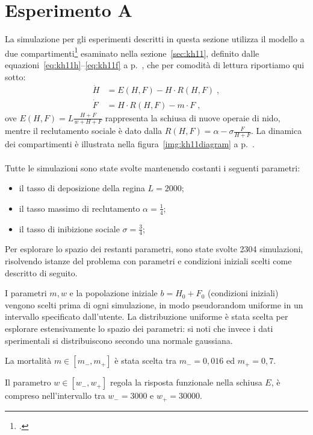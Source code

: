 \section{Esperimento A}
\label{sec:esperimentoA}
La simulazione per gli esperimenti descritti in questa sezione utilizza il modello a due compartimenti\footcite{khoury2011}
esaminato nella sezione~\ref{sec:kh11},
definito dalle equazioni~\eqref{eq:kh11h}--\eqref{eq:kh11f} a p.~\pageref{eq:kh11h}, che per comodità
di lettura riportiamo qui sotto:
\begin{align*}
    \dot{H} &= E(H,F)- H \cdot R(H,F)\; , \\
    \dot{F} &= H \cdot R(H,F)  - m \cdot F\; ,
\end{align*}
ove $E(H,F) = L \frac{H+F}{w + H + F}$ rappresenta la schiusa di nuove operaie di nido,
mentre il reclutamento sociale è dato dalla $R(H,F) = \alpha - \sigma \frac{F}{H+F}$.
La dinamica dei compartimenti è illustrata nella figura~\ref{img:kh11diagram} a p.~\pageref{img:kh11diagram}.

\paragraph{}
Tutte le simulazioni sono state svolte mantenendo costanti i seguenti parametri:
\begin{itemize}
    \item il tasso di deposizione della regina $L=2000$;
    \item il tasso massimo di reclutamento $\alpha = \frac{1}{4}$;
    \item il tasso di inibizione sociale $\sigma = \frac{3}{4}$;
\end{itemize}

Per esplorare lo spazio dei restanti parametri, sono state svolte 2304 simulazioni, risolvendo istanze del problema
con parametri e condizioni iniziali scelti come descritto di seguito.

I parametri $m,w$ e la popolazione iniziale $b=H_0 + F_0$ (condizioni iniziali) vengono scelti prima di ogni simulazione,
in modo pseudorandom uniforme in un intervallo specificato dall'utente. La distribuzione uniforme è stata scelta per esplorare estensivamente
lo spazio dei parametri: si noti che invece i dati sperimentali si distribuiscono secondo una normale gaussiana.

La mortalità $m \in \left[ m_-, m_+ \right]$ è stata scelta tra $m_-=0,016$ ed $m_+ =0,7$.

Il parametro $w \in \left[ w_-, w_+ \right]$ regola la risposta funzionale nella schiusa $E$, è
compreso nell'intervallo tra $w_- = 3000$ e $w_+ = 30000$.


